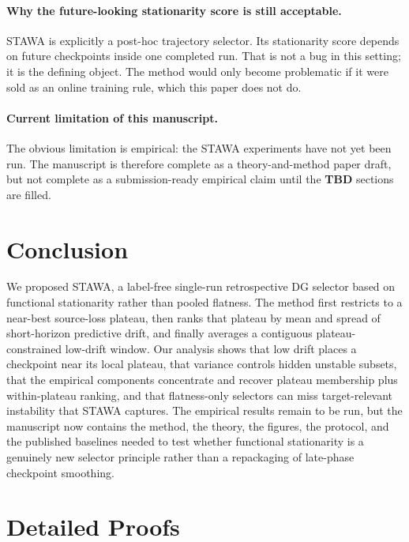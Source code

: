 \documentclass{article}
\newcommand{\TBD}{\textbf{TBD}}
\newcommand{\stawa}{\textup{\textsc{STAWA}}}
\begin{document}
\paragraph{Why the future-looking stationarity score is still acceptable.}
\stawa{} is explicitly a post-hoc trajectory selector. Its stationarity score depends on future checkpoints inside one completed run. That is not a bug in this setting; it is the defining object. The method would only become problematic if it were sold as an online training rule, which this paper does not do.

\paragraph{Current limitation of this manuscript.}
The obvious limitation is empirical: the \stawa{} experiments have not yet been run. The manuscript is therefore complete as a theory-and-method paper draft, but not complete as a submission-ready empirical claim until the \TBD{} sections are filled.

\section{Conclusion}

We proposed \stawa{}, a label-free single-run retrospective DG selector based on functional stationarity rather than pooled flatness. The method first restricts to a near-best source-loss plateau, then ranks that plateau by mean and spread of short-horizon predictive drift, and finally averages a contiguous plateau-constrained low-drift window. Our analysis shows that low drift places a checkpoint near its local plateau, that variance controls hidden unstable subsets, that the empirical components concentrate and recover plateau membership plus within-plateau ranking, and that flatness-only selectors can miss target-relevant instability that \stawa{} captures. The empirical results remain to be run, but the manuscript now contains the method, the theory, the figures, the protocol, and the published baselines needed to test whether functional stationarity is a genuinely new selector principle rather than a repackaging of late-phase checkpoint smoothing.




\appendix

\section{Detailed Proofs}
\end{document}
